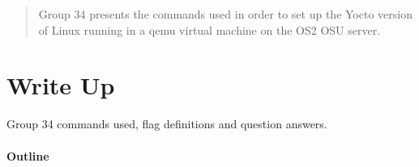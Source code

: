 \documentclass[titlepage,draftclsnofoot,onecolumn]{article}
\begin{document}
\maketitle

\begin{abstract}
  Group 34 presents the commands used in order to set up the Yocto version of Linux running in a qemu virtual machine on the OS2 OSU server.
\end{abstract}

\section*{Write Up}
Group 34 commands used, flag definitions and question answers.

\paragraph{Outline}
\end{document}

